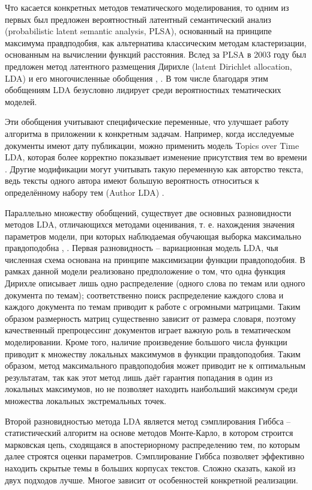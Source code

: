 Что касается конкретных методов тематического моделирования, то одним из первых был предложен вероятностный латентный семантический анализ (probabilistic latent semantic analysis, PLSA), основанный на принципе максимума правдподобия, как альтернатива классическим методам кластеризации, основанным на вычислении функций расстояния. Вслед за PLSA в 2003 году был предложен метод латентного размещения Дирихле (latent Dirichlet allocation, LDA) \cite{LDAOrigin} и его многочисленные обобщения \cite{NeedlesInAHaystack}, \cite{LDASurvey}. В том числе благодаря этим обобщениям LDA безусловно лидирует среди вероятностных тематических моделей.

Эти обобщения учитывают специфические переменные, что улучшает работу алгоритма в приложении к конкретным задачам. Например, когда исследуемые документы имеют дату публикации, можно применить модель Topics over Time LDA, которая более корректно показывает изменение присутствия тем во времени \cite{ToTLDA}. Другие модификации могут учитывать такую переменную как авторство текста, ведь тексты одного автора имеют большую вероятность относиться к определённому набору тем (Author LDA) \cite{authorLDA}.

Параллельно множеству обобщений, существует две основных разновидности методов LDA, отличающихся методами оценивания, т. е. нахождения значения параметров модели, при которых наблюдаемая обучающая выборка максимально правдоподобна \cite{kolcovaJJ}, \cite[стр. 1]{HoffmanBB10}. Первая разновидность -- вариационная модель LDA, чья численная схема основана на принципе максимизации функции правдоподобия. В рамках данной модели реализовано предположение о том, что одна функция Дирихле описывает лишь одно распределение (одного слова по темам или одного документа по темам); соответственно поиск распределение каждого слова и каждого документа по темам приводит к работе с огромными матрицами. Таким образом размерность матриц существенно зависит от размера словаря, поэтому качественный препроцессинг документов играет важную роль в тематическом моделировании. Кроме того, наличие произведение большого числа функции приводит к множеству локальных максимумов в функции правдоподобия. Таким образом, метод максимального правдоподобия может приводит не к оптимальным результатам, так как этот метод лишь даёт гарантия попадания в один из локальных максимумов, но не позволяет находить наибольший максимум среди множества локальных экстремальных точек.

Второй разновидностью метода LDA является метод сэмплирования Гиббса -- статистический алгоритм на основе методов Монте-Карло, в котором строится марковская цепь, сходящаяся в апостериорному распределению тем, по которым далее строятся оценки параметров. Сэмплирование Гиббса позволяет эффективно находить скрытые темы в больших корпусах текстов. Сложно сказать, какой из двух подходов лучше. Многое зависит от особенностей конкретной реализации.

